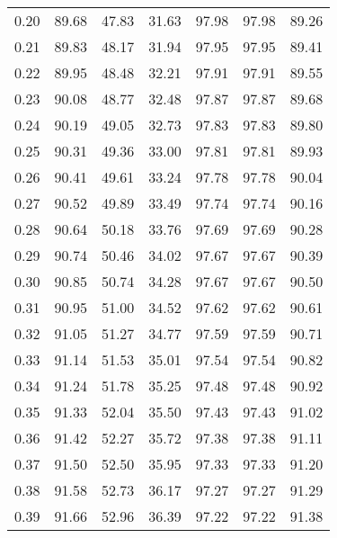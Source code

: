 \begin{tabular}{|c|c|c|c|c|c|c|}
      0.20 &     89.68 &     47.83 &      31.63 &   97.98 &      97.98 &         89.26 \\
      0.21 &     89.83 &     48.17 &      31.94 &   97.95 &      97.95 &         89.41 \\
      0.22 &     89.95 &     48.48 &      32.21 &   97.91 &      97.91 &         89.55 \\
      0.23 &     90.08 &     48.77 &      32.48 &   97.87 &      97.87 &         89.68 \\
      0.24 &     90.19 &     49.05 &      32.73 &   97.83 &      97.83 &         89.80 \\
      0.25 &     90.31 &     49.36 &      33.00 &   97.81 &      97.81 &         89.93 \\
      0.26 &     90.41 &     49.61 &      33.24 &   97.78 &      97.78 &         90.04 \\
      0.27 &     90.52 &     49.89 &      33.49 &   97.74 &      97.74 &         90.16 \\
      0.28 &     90.64 &     50.18 &      33.76 &   97.69 &      97.69 &         90.28 \\
      0.29 &     90.74 &     50.46 &      34.02 &   97.67 &      97.67 &         90.39 \\
      0.30 &     90.85 &     50.74 &      34.28 &   97.67 &      97.67 &         90.50 \\
      0.31 &     90.95 &     51.00 &      34.52 &   97.62 &      97.62 &         90.61 \\
      0.32 &     91.05 &     51.27 &      34.77 &   97.59 &      97.59 &         90.71 \\
      0.33 &     91.14 &     51.53 &      35.01 &   97.54 &      97.54 &         90.82 \\
      0.34 &     91.24 &     51.78 &      35.25 &   97.48 &      97.48 &         90.92 \\
      0.35 &     91.33 &     52.04 &      35.50 &   97.43 &      97.43 &         91.02 \\
      0.36 &     91.42 &     52.27 &      35.72 &   97.38 &      97.38 &         91.11 \\
      0.37 &     91.50 &     52.50 &      35.95 &   97.33 &      97.33 &         91.20 \\
      0.38 &     91.58 &     52.73 &      36.17 &   97.27 &      97.27 &         91.29 \\
      0.39 &     91.66 &     52.96 &      36.39 &   97.22 &      97.22 &         91.38 \\

\end{tabular}
